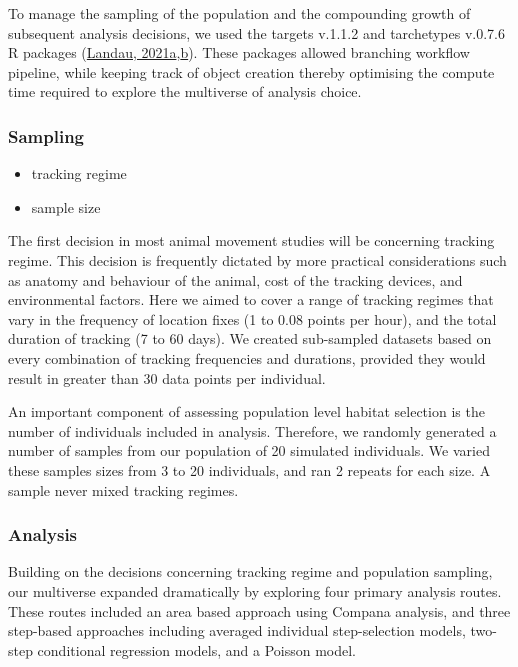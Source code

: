 \documentclass[10pt,a4paper]{article}
\begin{document}
To manage the sampling of the population and the compounding growth of subsequent analysis decisions, we used the targets v.1.1.2 and tarchetypes v.0.7.6 R packages (\protect\hyperlink{ref-targets}{Landau, 2021a},\protect\hyperlink{ref-tarchetypes}{b}).
These packages allowed branching workflow pipeline, while keeping track of object creation thereby optimising the compute time required to explore the multiverse of analysis choice.

\hypertarget{sampling}{%
\subsubsection{Sampling}\label{sampling}}

\begin{itemize}
\item
  tracking regime
\item
  sample size
\end{itemize}

The first decision in most animal movement studies will be concerning tracking regime.
This decision is frequently dictated by more practical considerations such as anatomy and behaviour of the animal, cost of the tracking devices, and environmental factors.
Here we aimed to cover a range of tracking regimes that vary in the frequency of location fixes (1 to 0.08 points per hour), and the total duration of tracking (7 to 60 days).
We created sub-sampled datasets based on every combination of tracking frequencies and durations, provided they would result in greater than 30 data points per individual.

An important component of assessing population level habitat selection is the number of individuals included in analysis.
Therefore, we randomly generated a number of samples from our population of 20 simulated individuals.
We varied these samples sizes from 3 to 20 individuals, and ran 2 repeats for each size.
A sample never mixed tracking regimes.

\hypertarget{analysis}{%
\subsubsection{Analysis}\label{analysis}}

Building on the decisions concerning tracking regime and population sampling, our multiverse expanded dramatically by exploring four primary analysis routes.
These routes included an area based approach using Compana analysis, and three step-based approaches including averaged individual step-selection models, two-step conditional regression models, and a Poisson model.
\end{document}
